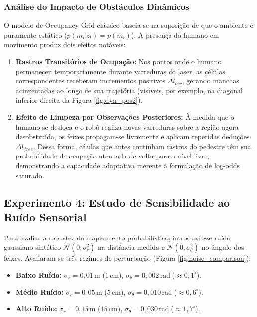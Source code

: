 \documentclass[11pt,a4paper]{article}
\begin{document}
\subsubsection{Análise do Impacto de Obstáculos Dinâmicos}
O modelo de Occupancy Grid clássico baseia-se na suposição de que o ambiente é puramente estático ($p(m_i | z_t) = p(m_i)$). A presença do humano em movimento produz dois efeitos notáveis:
\begin{enumerate}
    \item \textbf{Rastros Transitórios de Ocupação:} Nos pontos onde o humano permaneceu temporariamente durante varreduras do laser, as células correspondentes receberam incrementos positivos $\Delta l_{occ}$, gerando manchas acinzentadas ao longo de sua trajetória (visíveis, por exemplo, na diagonal inferior direita da Figura \ref{fig:dyn_pos2}).
    \item \textbf{Efeito de Limpeza por Observações Posteriores:} À medida que o humano se desloca e o robô realiza novas varreduras sobre a região agora desobstruída, os feixes propagam-se livremente e aplicam repetidas deduções $\Delta l_{free}$. Dessa forma, células que antes continham rastros do pedestre têm sua probabilidade de ocupação atenuada de volta para o nível livre, demonstrando a capacidade adaptativa inerente à formulação de log-odds saturado.
\end{enumerate}

\subsection{Experimento 4: Estudo de Sensibilidade ao Ruído Sensorial}
Para avaliar a robustez do mapeamento probabilístico, introduziu-se ruído gaussiano sintético $\mathcal{N}(0, \sigma_r^2)$ na distância medida e $\mathcal{N}(0, \sigma_\theta^2)$ no ângulo dos feixes. Avaliaram-se três regimes de perturbação (Figura \ref{fig:noise_comparison}):
\begin{itemize}
    \item \textbf{Baixo Ruído:} $\sigma_r = 0{,}01$\,m ($1$\,cm), $\sigma_\theta = 0{,}002$\,rad ($\approx 0{,}1^\circ$).
    \item \textbf{Médio Ruído:} $\sigma_r = 0{,}05$\,m ($5$\,cm), $\sigma_\theta = 0{,}010$\,rad ($\approx 0{,}6^\circ$).
    \item \textbf{Alto Ruído:} $\sigma_r = 0{,}15$\,m ($15$\,cm), $\sigma_\theta = 0{,}030$\,rad ($\approx 1{,}7^\circ$).
\end{itemize}
\end{document}
